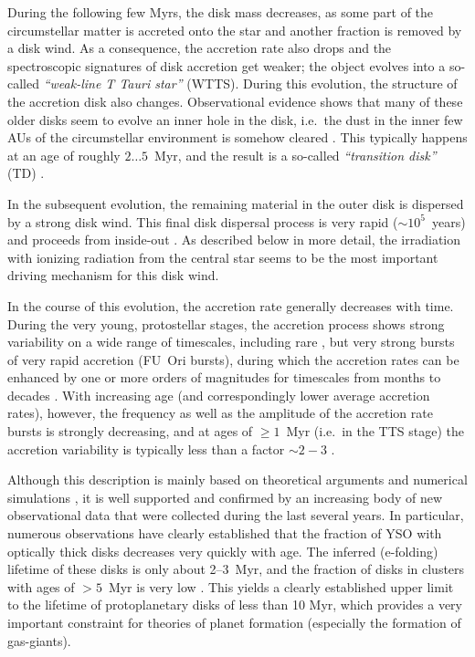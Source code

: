 \documentclass[10pt,fleqn,twoside,a4paper]{article}
\begin{document}
\smallskip

During the following few Myrs, the disk mass decreases, as some part of
the circumstellar matter is accreted onto the star and another fraction
is removed by a disk wind.
As a consequence, the accretion rate also drops and the spectroscopic 
signatures of disk accretion get weaker; 
the object evolves into a so-called   {\em ``weak-line T Tauri star''}
(WTTS).
During this evolution, the structure of the accretion disk also changes.
Observational evidence  shows that many of these older disks 
seem to evolve an inner hole in the disk, i.e.~the dust in the inner few AUs of the
circumstellar environment is somehow cleared \citep[e.g.,][]{Alexander14,Koepferl13}.
This typically happens at an age of roughly $ 2 \dots 5$~Myr, and
the result is a so-called {\em ``transition disk''} (TD)
\citep[see][]{Owen16}.
\smallskip

In the subsequent evolution, the remaining material in the outer
disk is dispersed by a strong disk wind.
This final disk dispersal process is very rapid ($\sim 10^5$~years)
and proceeds from inside-out \citep{Ercolano14}. As described below in more detail,
the irradiation with ionizing radiation from the central star seems to be
the most important driving mechanism for this disk wind.

\medskip

In the course of this  evolution, the accretion rate generally decreases with time. 
During the very young, protostellar stages,
the accretion process shows strong
 variability on a wide range of timescales, including rare \citep[see][]{HF15}, 
but very strong
bursts of very rapid accretion (FU~Ori bursts), during
which the accretion rates
can be enhanced  by one or more orders of magnitudes for timescales
from months to decades
\citep[see][and the illustration in Fig.~\ref{hartmann.fig}]{Hartmann16}.
%
With increasing age (and correspondingly lower average accretion rates),
however,
the frequency as well as the amplitude of the accretion rate
bursts is strongly decreasing, and at ages of $\ge 1$~Myr (i.e.~in the
TTS stage) the accretion variability is typically less than a factor $\sim 2-3$
\citep[see][]{Venuti14}.




\medskip

Although this description is mainly based on theoretical arguments and
numerical simulations \citep{Ercolano11,Alexander14}, it is well supported and confirmed by an
increasing body of new observational 
data that were collected during the last several years. 
%
In particular, numerous observations have clearly established that
the fraction of YSO with optically thick disks decreases very
quickly with age. The inferred (e-folding) lifetime of these disks
is only about 2--3~Myr, and the fraction of disks in clusters 
with  ages of $> 5$~Myr is very low \citep[e.g.,][]{Hernandez07}. This yields a clearly
established upper limit to the lifetime of protoplanetary disks of
 less than 10 Myr, which provides 
a very important constraint for theories of planet formation
(especially the formation of gas-giants).
\end{document}
